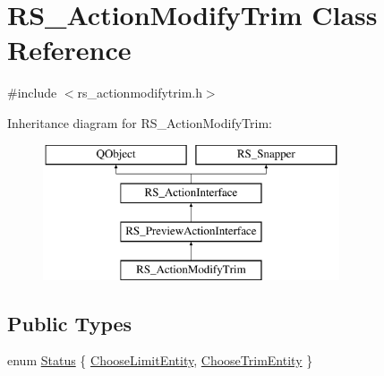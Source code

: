 \hypertarget{classRS__ActionModifyTrim}{\section{R\-S\-\_\-\-Action\-Modify\-Trim Class Reference}
\label{classRS__ActionModifyTrim}
}


{\ttfamily \#include $<$rs\-\_\-actionmodifytrim.\-h$>$}

Inheritance diagram for R\-S\-\_\-\-Action\-Modify\-Trim\-:\begin{figure}[H]
\begin{center}
\leavevmode
\includegraphics[height=4.000000cm]{classRS__ActionModifyTrim}
\end{center}
\end{figure}
\subsection*{Public Types}
\begin{DoxyCompactItemize}
\item 
enum \hyperlink{classRS__ActionModifyTrim_a521594ffd83b9267b637fb7e36937c1e}{Status} \{ \hyperlink{classRS__ActionModifyTrim_a521594ffd83b9267b637fb7e36937c1ea408fa881c80d71900494fa9a60b82342}{Choose\-Limit\-Entity}, 
\hyperlink{classRS__ActionModifyTrim_a521594ffd83b9267b637fb7e36937c1ea9e6134a551f22c5c52c4d6e5464801f7}{Choose\-Trim\-Entity}
 \}
\end{DoxyCompactItemize}

